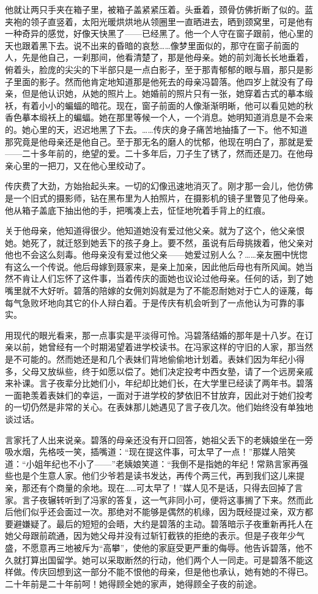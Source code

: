 \documentclass[UTF8]{ctexart}
\begin{document}
他就让两只手夹在箱子里，被箱子盖紧紧压着。头垂着，颈骨仿佛折断了似的。蓝夹袍的领子直竖着，太阳光暖烘烘地从领圈里一直晒进去，晒到颈窝里，可是他有一种奇异的感觉，好像天快黑了——已经黑了。他一个人守在窗子跟前，他心里的天也跟着黑下去。说不出来的昏暗的哀愁……像梦里面似的，那守在窗子前面的人，先是他自己，一刹那间，他看清楚了，那是他母亲。她的前刘海长长地垂着，俯着头，脸庞的尖尖的下半部只是一点白影子，至于那青郁郁的眼与眉，那只是影子里面的影子。然而他肯定地知道那是他死去的母亲冯碧落。他四岁上就没有了母亲，但是他认识她，从她的照片上。她婚前的照片只有一张，她穿着古式的摹本缎袄，有着小小的蝙蝠的暗花。现在，窗子前面的人像渐渐明晰，他可以看见她的秋香色摹本缎袄上的蝙蝠。她在那里等候一个人，一个消息。她明知道消息是不会来的。她心里的天，迟迟地黑了下去。……传庆的身子痛苦地抽搐了一下。他不知道那究竟是他母亲还是他自己。至于那无名的磨人的忧郁，他现在明白了，那就是爱——二十多年前的，绝望的爱。二十多年后，刀子生了锈了，然而还是刀。在他母亲心里的一把刀，又在他心里绞动了。

传庆费了大劲，方始抬起头来。一切的幻像迅速地消灭了。刚才那一会儿，他仿佛是一个旧式的摄影师，钻在黑布里为人拍照片，在摄影机的镜子里瞥见了他母亲。他从箱子盖底下抽出他的手，把嘴凑上去，怔怔地吮着手背上的红痕。

关于他母亲，他知道得很少。他知道她没有爱过他父亲。就为了这个，他父亲恨她。她死了，就迁怒到她丢下的孩子身上。要不然，虽说有后母挑拨着，他父亲对他也不会这么刻毒。他母亲没有爱过他父亲——她爱过别人么？……亲友圈中恍惚有这么一个传说。他后母嫁到聂家来，是亲上加亲，因此他后母也有所风闻。她当然不肯让人们忘怀了这件事，当着传庆的面她也议论过他母亲。任何的话，到了她嘴里就不大好听。碧落的陪嫁的女佣刘妈就是为了不能忍耐她对于亡人的诬蔑，每每气急败坏地向其它的仆人辩白着。于是传庆有机会听到了一点他认为可靠的事实。

用现代的眼光看来，那一点事实是平淡得可怜。冯碧落结婚的那年是十八岁。在订亲以前，她曾经有一个时期渴望着进学校读书。在冯家这样的守旧的人家，那当然是不可能的。然而她还是和几个表妹们背地偷偷地计划着。表妹们因为年纪小得多，父母又放纵些，终于如愿以偿了。她们决定投考中西女塾，请了一个远房亲戚来补课。言子夜辈分比她们小，年纪却比她们长，在大学里已经读了两年书。碧落一面艳羡着表妹们的幸运，一面对于进学校的梦依旧不甘放弃，因此对于她们投考的一切仍然是非常的关心。在表妹那儿她遇见了言子夜几次。他们始终没有单独地谈过话。

言家托了人出来说亲。碧落的母亲还没有开口回答，她祖父丢下的老姨娘坐在一旁吸水烟，先格吱一笑，插嘴道：“现在提这件事，可太早了一点！”那媒人陪笑道：“小姐年纪也不小了——”老姨娘笑道：“我倒不是指她的年纪！常熟言家再强些也是个生意人家。他们少爷若是读书发达，再传个两三代，再到我们这儿来提亲，那还有个商量的余地。现在……可太早了！”媒人见不是话，只得去回掉了言家。言子夜辗转听到了冯家的答复，这一气非同小可，便将这事搁了下来。然而此后他们似乎还会面过一次。那绝对不能够是偶然的机缘，因为既经提过亲，双方都要避嫌疑了。最后的短短的会晤，大约是碧落的主动。碧落暗示子夜重新再托人在她父母跟前疏通，因为她父母并没有过斩钉截铁的拒绝的表示。但是子夜年少气盛，不愿意再三地被斥为“高攀”，使他的家庭受更严重的侮辱。他告诉碧落，他不久就打算出国留学。她可以采取断然的行动，他们两个人一同走。可是碧落不能这样做。传庆回想到这一部分不能不恨他的母亲，但是他也承认，她有她的不得已。二十年前是二十年前呵！她得顾全她的家声，她得顾全子夜的前途。
\end{document}
